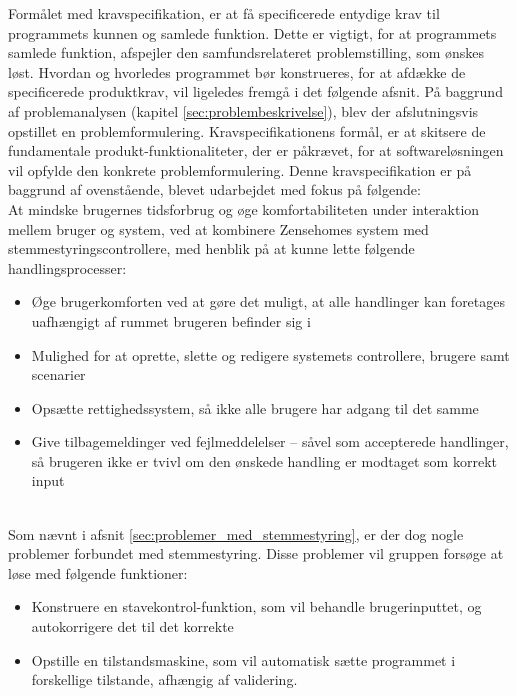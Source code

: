Formålet med kravspecifikation, er at få specificerede entydige krav til programmets kunnen og samlede funktion. Dette er vigtigt, for at programmets samlede funktion, afspejler den samfundsrelateret problemstilling, som ønskes løst. Hvordan og hvorledes programmet bør konstrueres, for at afdække de specificerede produktkrav, vil ligeledes fremgå i det følgende afsnit. På baggrund af problemanalysen (kapitel \ref{sec:problembeskrivelse}), blev der afslutningsvis opstillet en problemformulering. Kravspecifikationens formål, er at skitsere de fundamentale produkt-funktionaliteter, der er påkrævet, for at softwareløsningen vil opfylde den konkrete problemformulering. Denne kravspecifikation er på baggrund af ovenstående, blevet udarbejdet med fokus på følgende: \\

At mindske brugernes tidsforbrug og øge komfortabiliteten under interaktion mellem bruger og system, ved at kombinere Zensehomes system med stemmestyringscontrollere, med henblik på at kunne lette følgende handlingsprocesser:
\begin{itemize}
    \item Øge brugerkomforten ved at gøre det muligt, at alle handlinger kan foretages uafhængigt af rummet brugeren befinder sig i
    \item Mulighed for at oprette, slette og redigere systemets controllere, brugere samt scenarier
    \item Opsætte rettighedssystem, så ikke alle brugere har adgang til det samme
    \item Give tilbagemeldinger ved fejlmeddelelser – såvel som accepterede handlinger, så brugeren ikke er tvivl om den ønskede handling er modtaget som korrekt input
\end{itemize}
\hspace*{\fill} \\
Som nævnt i afsnit \ref{sec:problemer_med_stemmestyring}, er der dog nogle problemer forbundet med stemmestyring. Disse problemer vil gruppen forsøge at løse med følgende funktioner:
\begin{itemize}
    \item Konstruere en stavekontrol-funktion, som vil behandle brugerinputtet, og autokorrigere det til det korrekte
    \item Opstille en tilstandsmaskine, som vil automatisk sætte programmet i forskellige tilstande, afhængig af validering.
\end{itemize}
    
